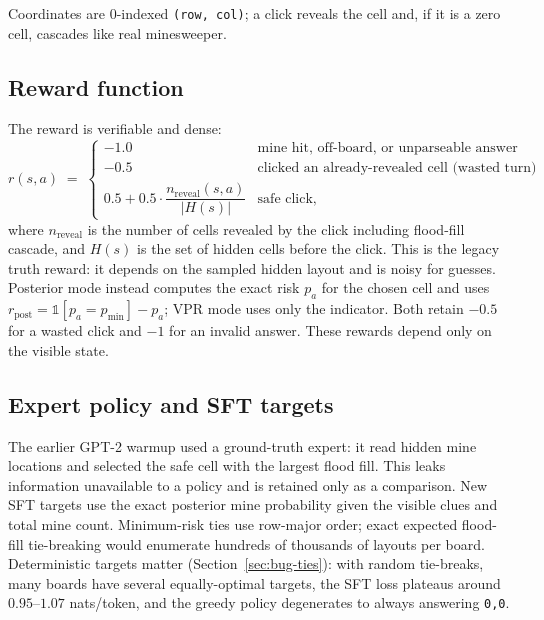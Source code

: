 \documentclass[11pt]{article}
\begin{document}
Coordinates are 0-indexed \texttt{(row, col)}; a click reveals the cell and,
if it is a zero cell, cascades like real minesweeper.

\subsection{Reward function}
The reward is verifiable and dense:
\begin{equation}
r(s, a) \;=\;
\begin{cases}
-1.0 & \text{mine hit, off-board, or unparseable answer}\\[2pt]
-0.5 & \text{clicked an already-revealed cell (wasted turn)}\\[2pt]
0.5 + 0.5 \cdot \dfrac{n_{\text{reveal}}(s,a)}{|H(s)|}
& \text{safe click},
\end{cases}
\label{eq:reward}
\end{equation}
where $n_{\text{reveal}}$ is the number of cells revealed by the click
including flood-fill cascade, and $H(s)$ is the set of hidden cells before the
click. This is the legacy truth reward: it depends on the sampled hidden
layout and is noisy for guesses. Posterior mode instead computes the exact
risk $p_a$ for the chosen cell and uses
$r_{\mathrm{post}}=\mathbb{1}[p_a=p_{\min}]-p_a$; VPR mode uses only the
indicator. Both retain $-0.5$ for a wasted click and $-1$ for an invalid
answer. These rewards depend only on the visible state.

\subsection{Expert policy and SFT targets}
The earlier GPT-2 warmup used a ground-truth expert: it read hidden mine
locations and selected the safe cell with the largest flood fill. This leaks
information unavailable to a policy and is retained only as a comparison.
New SFT targets use the exact posterior mine probability given the visible
clues and total mine count. Minimum-risk ties use row-major order; exact
expected flood-fill tie-breaking would enumerate hundreds of thousands of
layouts per board.
Deterministic targets matter (Section~\ref{sec:bug-ties}): with random
tie-breaks, many boards have several equally-optimal targets, the SFT loss
plateaus around $0.95$--$1.07$ nats/token, and the greedy policy degenerates
to always answering \texttt{0,0}.
\end{document}

